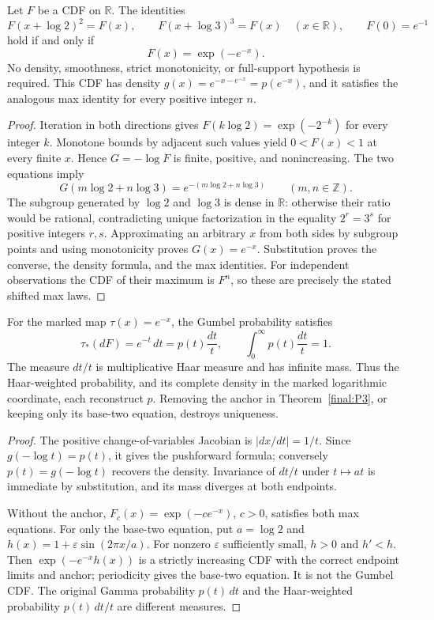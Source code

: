 \begin{theorem}
\label{final:P3}
Let $F$ be a CDF on $\mathbb R$.  The identities
\[
 F(x+\log2)^2=F(x),\qquad F(x+\log3)^3=F(x)
       \quad(x\in\mathbb R),\qquad F(0)=e^{-1}
\]
hold if and only if
\[
 F(x)=\exp(-e^{-x}).
\]
No density, smoothness, strict monotonicity, or full-support
hypothesis is required.  This CDF has density
$g(x)=e^{-x-e^{-x}}=p(e^{-x})$, and it satisfies the analogous
max identity for every positive integer $n$.
\end{theorem}
\begin{proof}
Iteration in both directions gives
$F(k\log2)=\exp(-2^{-k})$ for every integer $k$.
Monotone bounds by adjacent such values yield $0<F(x)<1$ at every
finite $x$.  Hence $G=-\log F$ is finite, positive, and nonincreasing.
The two equations imply
\[
 G(m\log2+n\log3)=e^{-(m\log2+n\log3)}
          \qquad(m,n\in\mathbb Z).
\]
The subgroup generated by $\log2$ and $\log3$ is dense in
$\mathbb R$: otherwise their ratio would be rational, contradicting
unique factorization in the equality $2^r=3^s$ for positive integers
$r,s$.  Approximating an arbitrary $x$ from both sides by subgroup
points and using monotonicity proves $G(x)=e^{-x}$.
Substitution proves the converse, the density formula, and the
max identities.  For independent observations the CDF of their
maximum is $F^n$, so these are precisely the stated shifted max laws.
\end{proof}

\begin{proposition}
\label{final:P3-haar}
For the marked map $\tau(x)=e^{-x}$, the Gumbel probability satisfies
\[
 \tau_*(dF)=e^{-t}\,dt=p(t)\frac{dt}{t},\qquad
 \int_0^\infty p(t)\frac{dt}{t}=1.
\]
The measure $dt/t$ is multiplicative Haar measure and has infinite
mass.  Thus the Haar-weighted probability, and its complete density
in the marked logarithmic coordinate, each reconstruct $p$.
Removing the anchor in Theorem~\ref{final:P3}, or keeping only its
base-two equation, destroys uniqueness.
\end{proposition}
\begin{proof}
The positive change-of-variables Jacobian is $|dx/dt|=1/t$.
Since $g(-\log t)=p(t)$, it gives the pushforward formula;
conversely $p(t)=g(-\log t)$ recovers the density.
Invariance of $dt/t$ under $t\mapsto at$ is immediate by
substitution, and its mass diverges at both endpoints.

Without the anchor, $F_c(x)=\exp(-c e^{-x})$, $c>0$, satisfies
both max equations.  For only the base-two equation, put
$a=\log2$ and $h(x)=1+\varepsilon\sin(2\pi x/a)$.
For nonzero $\varepsilon$ sufficiently small, $h>0$ and $h'<h$.
Then $\exp(-e^{-x}h(x))$ is a strictly increasing CDF with the
correct endpoint limits and anchor; periodicity gives the base-two
equation.  It is not the Gumbel CDF.  The original Gamma probability
$p(t)\,dt$ and the Haar-weighted probability $p(t)\,dt/t$ are
different measures.
\end{proof}

